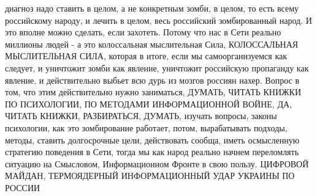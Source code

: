  
 
 
 
 



диагноз надо ставить в целом, а не конкретным зомби, в целом, то есть всему
российскому народу, и лечить в целом, весь российский зомбированный народ. И
это вполне можно сделать, если захотеть. Потому что нас в Сети реально миллионы
людей - а это колоссальная мыслительная Сила, КОЛОССАЛЬНАЯ МЫСЛИТЕЛЬНАЯ СИЛА,
которая в итоге, если мы самоорганизуемся как следует, и уничтожит зомби как
явление, уничтожит российскую пропаганду как явление, и действительно выбьет
всю дурь из мозгов россиян нахер. Вопрос в том, что этим действительно нужно
заниматься, ДУМАТЬ, ЧИТАТЬ КНИЖКИ ПО ПСИХОЛОГИИ, ПО МЕТОДАМИ ИНФОРМАЦИОННОЙ
ВОЙНЕ, ДА, ЧИТАТЬ КНИЖКИ, РАЗБИРАТЬСЯ, ДУМАТЬ, изучать вопросы, законы
психологии, как это зомбирование работает, потом, вырабатывать подходы, методы,
ставить долгосрочные цели, действовать сообща, иметь осмысленную стратегию
поведения в Сети, тогда мы как народ реально начнем переломлять ситуацию на
Смысловом, Информационном Фронте в свою пользу. ЦИФРОВОЙ МАЙДАН, ТЕРМОЯДЕРНЫЙ
ИНФОРМАЦИОННЫЙ УДАР УКРАИНЫ ПО РОССИИ
